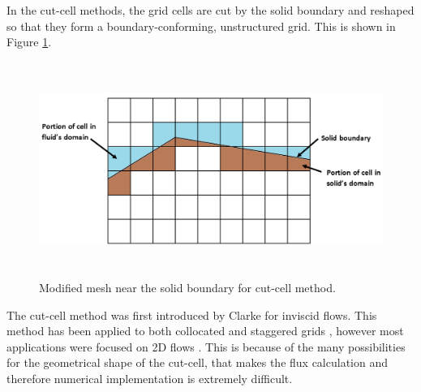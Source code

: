 In the cut-cell methods, the grid cells are cut by the solid boundary and reshaped so that they form a boundary-conforming, unstructured grid. This is shown in Figure \ref{fig:C1_cutCellMesh}.

\begin{figure}[H]
	\centering
	\includegraphics[height=7.0cm]{Chapter_1/figure/cut_cell_mesh}
	\caption{Modified mesh near the solid boundary for cut-cell method.}
	\label{fig:C1_cutCellMesh}
\end{figure}

The cut-cell method was first introduced by Clarke \cite{clarke1986euler} for inviscid flows. This method has been applied to both collocated and staggered grids \cite{kirkpatrick2003representation}, however most applications were focused on 2D flows \cite{hu2006conservative, udaykumar1999computation}. This is because of the many possibilities for the geometrical shape of the cut-cell, that makes the flux calculation and therefore numerical implementation is extremely difficult.

